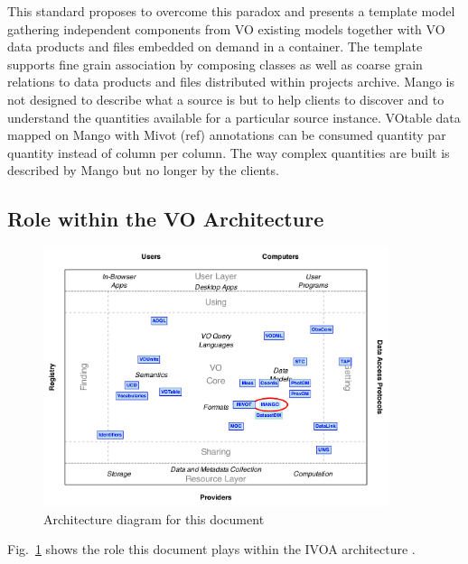 \documentclass[11pt,a4paper]{ivoa}
\begin{document}
This standard proposes to overcome this paradox and presents a template model gathering independent
components from VO existing models together with VO data products and files embedded on demand in a container.
The template supports fine grain association by composing classes as well as coarse grain relations
to data products and files distributed within projects archive.
Mango is not designed to describe what a source is but to help clients to discover and to understand
the quantities available for a particular source instance.
VOtable data mapped on Mango with Mivot (ref) annotations can be consumed quantity 
par quantity instead of column per column.
The way complex quantities are built is  described by Mango but no longer by the clients.

\subsection{Role within the VO Architecture}

\begin{figure}
\centering


\includegraphics[width=0.9\textwidth]{role_diagram.pdf}
\caption{Architecture diagram for this document}
\label{fig:archdiag}
\end{figure}

Fig.~\ref{fig:archdiag} shows the role this document plays within the
IVOA architecture \citep{2010ivoa.rept.1123A}.
\end{document}
